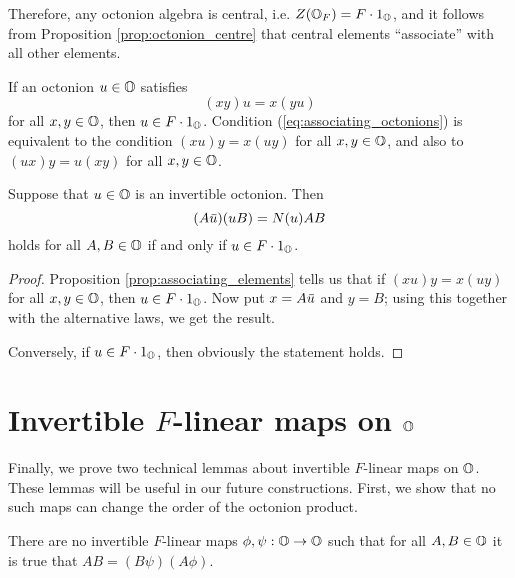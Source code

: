 Therefore, any octonion algebra is central, i.e. $Z(\mathbb{O}_F) = F\cdot 1_{\mathbb{O}}$, and it follows from Proposition 
\ref{prop:octonion_centre} that central elements
``associate'' with all other elements.

\begin{proposition}
	\label{prop:associating_elements}
	If an octonion $u \in \mathbb{O}$ satisfies
	\begin{equation}
		\label{eq:associating_octonions}
		(xy)u = x(yu)
	\end{equation}
	for all $x,y \in \mathbb{O}$, then $u \in F\cdot 1_{\mathbb{O}}$. Condition (\ref{eq:associating_octonions})
	is equivalent to the condition $(xu)y = x(uy)$ for all $x,y \in \mathbb{O}$, and also to
	$(ux)y = u(xy)$ for all $x,y \in \mathbb{O}$. 
\end{proposition}

\begin{corollary}
	\label{cor:1_auub}
	Suppose that $u\in \mathbb{O}$ is an invertible octonion. Then
	\begin{equation}
		(A\mathord{\mbox{\hspace*{0pt}}\,\overline{\!u\!\!\;}\!\:}\mbox{\hspace*{0pt}})(u B) = N(u) AB
	\end{equation}
	holds for all $A,B \in \mathbb{O}$ if and only if $u \in F \cdot 1_{\mathbb{O}}$. 
\end{corollary}

\begin{proof}
	Proposition \ref{prop:associating_elements} tells us that if $(xu) y = x(uy)$ for all
	$x,y \in \mathbb{O}$, then $u \in F \cdot 1_{\mathbb{O}}$. Now put $x = A\mathord{\mbox{\hspace*{0pt}}\,\overline{\!u\!\!\;}\!\:}\mbox{\hspace*{0pt}}$ and $y = B$; using this together with
	the alternative laws, we get the result. 
	
	Conversely, if $u \in F\cdot 1_{\mathbb{O}}$, then obviously the statement holds. 
\end{proof}

\section{Invertible $F$-linear maps on $\mathbb{O}$}

Finally, we prove two technical lemmas about invertible $F$-linear maps
on $\mathbb{O}$. These lemmas will be useful in our future constructions. 
First, we show that no such maps can change the order of the octonion product.

\begin{lemma}
    \label{lemma:1_white_phipsi1}
    There are no invertible $F$-linear maps $\phi,\psi : \mathbb{O} \rightarrow \mathbb{O}$ such that for all
    $A,B \in \mathbb{O}$ it is true that $AB = (B\psi) (A\phi)$.
\end{lemma}

